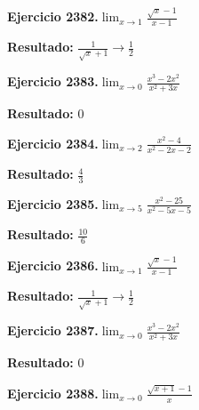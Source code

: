\documentclass[10pt,a4paper]{article}
\begin{document}
\begin{ejbox}
\textbf{Ejercicio 2382.}\quad $\lim_{x\to 1} \frac{\sqrt{x}-1}{x-1}$
\end{ejbox}

\begin{solbox}
\textbf{Resultado:} \(\displaystyle \frac{1}{\sqrt{x}+1} \to \frac{1}{2}\)
\end{solbox}

\begin{ejbox}
\textbf{Ejercicio 2383.}\quad $\lim_{x\to 0} \frac{x^3-2x^2}{x^2+3x}$
\end{ejbox}

\begin{solbox}
\textbf{Resultado:} \(\displaystyle 0\)
\end{solbox}

\newpage
\begin{ejbox}
\textbf{Ejercicio 2384.}\quad $\lim_{x\to 2} \frac{x^2-4}{x^2-2x-2}$
\end{ejbox}

\begin{solbox}
\textbf{Resultado:} \(\displaystyle \frac{4}{3}\)
\end{solbox}

\begin{ejbox}
\textbf{Ejercicio 2385.}\quad $\lim_{x\to 5} \frac{x^2-25}{x^2-5x-5}$
\end{ejbox}

\begin{solbox}
\textbf{Resultado:} \(\displaystyle \frac{10}{6}\)
\end{solbox}

\begin{ejbox}
\textbf{Ejercicio 2386.}\quad $\lim_{x\to 1} \frac{\sqrt{x}-1}{x-1}$
\end{ejbox}

\begin{solbox}
\textbf{Resultado:} \(\displaystyle \frac{1}{\sqrt{x}+1} \to \frac{1}{2}\)
\end{solbox}

\newpage
\begin{ejbox}
\textbf{Ejercicio 2387.}\quad $\lim_{x\to 0} \frac{x^3-2x^2}{x^2+3x}$
\end{ejbox}

\begin{solbox}
\textbf{Resultado:} \(\displaystyle 0\)
\end{solbox}

\begin{ejbox}
\textbf{Ejercicio 2388.}\quad $\lim_{x\to 0} \frac{\sqrt{x+1}-1}{x}$
\end{ejbox}
\end{document}

